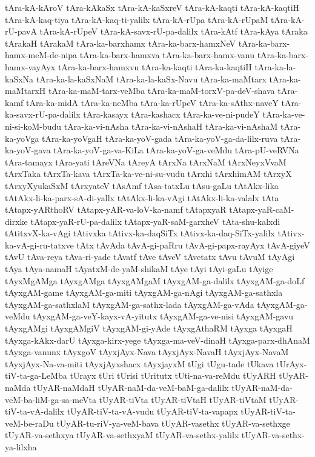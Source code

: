 {tAra-kA-kAroV
tAra-kAkaSx
tAra-kA-kaSxreV
tAra-kA-kaqti
tAra-kA-kaqtiH
tAra-kA-kaq-tiya
tAra-kA-kaq-ti-yalilx
tAra-kA-rUpa
tAra-kA-rUpaM
tAra-kA-rU-pavA
tAra-kA-rUpeV
tAra-kA-savx-rU-pa-dalilx
tAra-kAtf
tAra-kAya
tAraka
tArakaH
tArakaM
tAra-ka-barxhamx
tAra-ka-barx-hamxNeV
tAra-ka-barx-hamx-meM-de-nipa
tAra-ka-barx-hamxva
tAra-ka-barx-hamx-vanu
tAra-ka-barx-hamx-vayAyx
tAra-ka-barx-hamxvu
tAra-ka-kaqti
tAra-ka-kaqtiH
tAra-ka-la-kaSxNa
tAra-ka-la-kaSxNaM
tAra-ka-la-kaSx-Navu
tAra-ka-maMtarx
tAra-ka-maMtarxH
tAra-ka-maM-tarx-veMba
tAra-ka-maM-torxV-pa-deV-shava
tAra-kamf
tAra-ka-midA
tAra-ka-neMba
tAra-ka-rUpeV
tAra-ka-sAthx-naveY
tAra-ka-savx-rU-pa-dalilx
tAra-kasayx
tAra-kashacx
tAra-ka-ve-ni-pudeY
tAra-ka-ve-ni-si-koM-budu
tAra-ka-vi-nAsha
tAra-ka-vi-nAshaH
tAra-ka-vi-nAshaM
tAra-ka-yoVga
tAra-ka-yoVgaH
tAra-ka-yoV-gada
tAra-ka-yoV-ga-da-lilx-ruva
tAra-ka-yoV-gava
tAra-ka-yoV-ga-va-KiLa
tAra-ka-yoV-ga-veMdu
tAra-pU-veRVNa
tAra-tamayx
tAra-yati
tAreVNa
tAreyA
tArxNa
tArxNaM
tArxNeyxVvaM
tArxTaka
tArxTa-kava
tArxTa-ka-ve-ni-su-vudu
tArxhi
tArxhimAM
tArxyX
tArxyXyukaSxM
tArxyateV
tAsAmf
tAsa-tatxLu
tAsu-gaLu
tAtAkx-lika
tAtAkx-li-ka-parx-sA-di-yallx
tAtAkx-li-ka-vAgi
tAtAkx-li-ka-valalx
tAta
tAtapx-yARthoRV
tAtapx-yAR-va-loV-ka-namf
tAtapxyaR
tAtapx-yaR-caM-dirxke
tAtapx-yaR-rU-pa-dalilx
tAtapx-yaR-saM-garxheV
tAta-shu-kalxdi
tAtitxvX-ka-vAgi
tAtivxka
tAtivx-ka-daqSiTx
tAtivx-ka-daq-SiTx-yalilx
tAtivx-ka-vA-gi-ru-tatxve
tAtx
tAvAda
tAvA-gi-paRru
tAvA-gi-papx-rayAyx
tAvA-giyeV
tAvU
tAva-reya
tAva-ri-yade
tAvatf
tAve
tAveV
tAvetatx
tAvu
tAvuM
tAyAgi
tAya
tAya-namaH
tAyatxM-de-yaM-shikaM
tAye
tAyi
tAyi-gaLu
tAyige
tAyxMgAMga
tAyxgAMga
tAyxgAMgaM
tAyxgAM-ga-dalilx
tAyxgAM-ga-doLf
tAyxgAM-game
tAyxgAM-ga-miti
tAyxgAM-ga-nAgi
tAyxgAM-ga-sathxla
tAyxgAM-ga-sathxlaM
tAyxgAM-ga-sathx-lada
tAyxgAM-ga-vAda
tAyxgAM-ga-veMdu
tAyxgAM-ga-veY-kayx-vA-yitutx
tAyxgAM-ga-ve-nisi
tAyxgAM-gavu
tAyxgAMgi
tAyxgAMgiV
tAyxgAM-gi-yAde
tAyxgAthaRM
tAyxga
tAyxgaH
tAyxga-kAkx-darU
tAyxga-kirx-yege
tAyxga-ma-veV-dinaH
tAyxga-parx-dhAnaM
tAyxga-vanunx
tAyxgoV
tAyxjAyx-Nava
tAyxjAyx-NavaH
tAyxjAyx-NavaM
tAyxjAyx-Na-va-miti
tAyxjAyxshacx
tAyxjayxM
tUgi
tUgu-tade
tUkava
tUrAyx-tiV-ta-ga-LeMba
tUrayx
tUri
tUrisi
tUritutx
tUti-na-va-reMdu
tUyARH
tUyAR-naMda
tUyAR-naMdaH
tUyAR-naM-da-veM-baM-ga-dalilx
tUyAR-naM-da-veM-ba-liM-ga-sa-meVta
tUyAR-tiVta
tUyAR-tiVtaH
tUyAR-tiVtaM
tUyAR-tiV-ta-vA-dalilx
tUyAR-tiV-ta-vA-vudu
tUyAR-tiV-ta-vapapx
tUyAR-tiV-ta-veM-be-raDu
tUyAR-tu-riV-ya-veM-bava
tUyAR-vasethx
tUyAR-va-sethxge
tUyAR-va-sethxya
tUyAR-va-sethxyaM
tUyAR-va-sethx-yalilx
tUyAR-va-sethx-ya-lilxha
}
